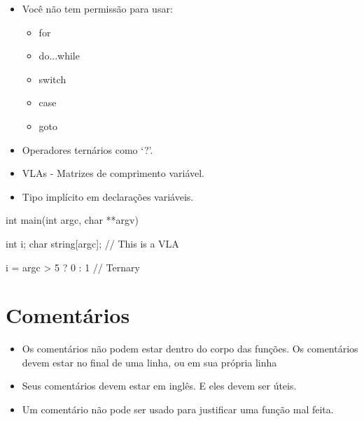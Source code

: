 \documentclass{42-pt}
\begin{document}
        \begin{itemize}

            \item Você não tem permissão para usar:

                \begin{itemize}

                    \item for
                    \item do...while
                    \item switch
                    \item case
                    \item goto

                \end{itemize}

            \item Operadores ternários como `?'.

            \item VLAs - Matrizes de comprimento variável.

            \item Tipo implícito em declarações variáveis.

        \end{itemize}
        \begin{42ccode}
    int main(int argc, char **argv)
    {
        int     i;
        char    string[argc]; // This is a VLA

        i = argc > 5 ? 0 : 1 // Ternary
    }
        \end{42ccode}
        \newpage

    \section{Comentários}

        \begin{itemize}

            \item Os comentários não podem estar dentro do corpo das funções.
                Os comentários devem estar no final de uma linha, ou em sua própria linha

            \item Seus comentários devem estar em inglês. E eles devem ser
                úteis.

            \item Um comentário não pode ser usado para justificar uma função 
				mal feita.

        \end{itemize}
        \newpage
\end{document}
